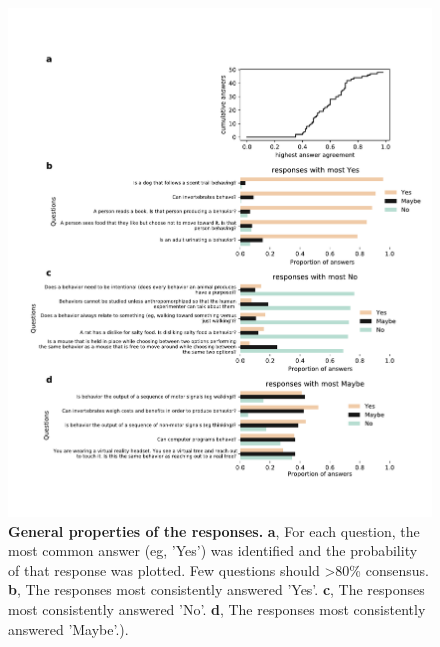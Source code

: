 \documentclass[a4paper, 11pt]{article}
\begin{document}
\begin{figure}
\centerline{\includegraphics[width=\textwidth]{supp_fig1.pdf}}
\caption{\textbf{General properties of the responses.} \textbf{a}, For each question, the most common answer (eg, 'Yes') was identified and the probability of that response was plotted. Few questions should >80\% consensus.  \textbf{b}, The responses most consistently answered 'Yes'. \textbf{c}, The responses most consistently answered 'No'. \textbf{d}, The responses most consistently answered 'Maybe'.).}
\end{figure}
\newpage
\end{document}
